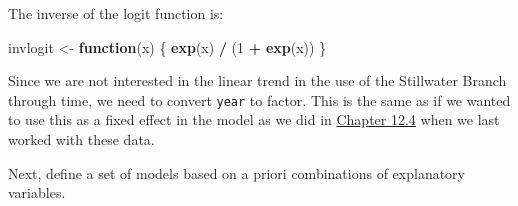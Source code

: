 \documentclass[
]{book}
\newenvironment{Shaded}{\begin{snugshade}}{\end{snugshade}}
\newcommand{\ControlFlowTok}[1]{\textcolor[rgb]{0.13,0.29,0.53}{\textbf{#1}}}
\newcommand{\DecValTok}[1]{\textcolor[rgb]{0.00,0.00,0.81}{#1}}
\newcommand{\KeywordTok}[1]{\textcolor[rgb]{0.13,0.29,0.53}{\textbf{#1}}}
\newcommand{\NormalTok}[1]{#1}
\newcommand{\OperatorTok}[1]{\textcolor[rgb]{0.81,0.36,0.00}{\textbf{#1}}}
\newcommand{\StringTok}[1]{\textcolor[rgb]{0.31,0.60,0.02}{#1}}
\begin{document}
The inverse of the logit function is:

\begin{Shaded}
\begin{Highlighting}[]
\NormalTok{invlogit <-}\StringTok{ }\ControlFlowTok{function}\NormalTok{(x) \{}
  \KeywordTok{exp}\NormalTok{(x) }\OperatorTok{/}\StringTok{ }\NormalTok{(}\DecValTok{1} \OperatorTok{+}\StringTok{ }\KeywordTok{exp}\NormalTok{(x))}
\NormalTok{\}}
\end{Highlighting}
\end{Shaded}

Since we are not interested in the linear trend in the use of the Stillwater Branch through time, we need to convert \texttt{year} to factor. This is the same as if we wanted to use this as a fixed effect in the model as we did in \href{https://danstich.github.io/worst-r/12-4-logistic.html}{Chapter 12.4} when we last worked with these data.

\begin{Shaded}
\end{Shaded}

Next, define a set of models based on a priori combinations of explanatory variables.
\end{document}
